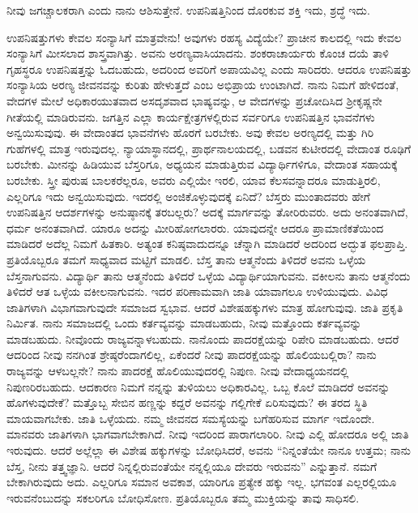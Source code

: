 ನೀವು ಜಗಚ್ಚಾಲಕರಾಗಿ ಎಂದು ನಾನು ಆಶಿಸುತ್ತೇನೆ. ಉಪನಿಷತ್ತಿನಿಂದ ದೊರಕುವ ಶಕ್ತಿ ಇದು, ಶ್ರದ್ಧೆ ಇದು.

ಉಪನಿಷತ್ತುಗಳು ಕೇವಲ ಸಂನ್ಯಾಸಿಗೆ ಮಾತ್ರವೇನು! ಅವುಗಳು ರಹಸ್ಯ ವಿದ್ಯೆಯೇ? ಪ್ರಾಚೀನ ಕಾಲದಲ್ಲಿ ಇದು ಕೇವಲ ಸಂನ್ಯಾಸಿಗೆ ಮೀಸಲಾದ ಶಾಸ್ತ್ರವಾಗಿತ್ತು. ಅವನು ಅರಣ್ಯವಾಸಿಯಾದನು. ಶಂಕರಾಚಾರ್ಯರು ಕೊಂಚ ದಯೆ ತಾಳಿ ಗೃಹಸ್ಥರೂ ಉಪನಿಷತ್ತನ್ನು ಓದಬಹುದು, ಅದರಿಂದ ಅವರಿಗೆ ಅಪಾಯವಿಲ್ಲ ಎಂದು ಸಾರಿದರು. ಆದರೂ ಉಪ\-ನಿಷತ್ತು ಸಂನ್ಯಾಸಿಯ ಅರಣ್ಯ ಜೀವನವನ್ನು ಕುರಿತು ಹೇಳುತ್ತದೆ ಎಂಬ ಅಭಿಪ್ರಾಯ ಉಂಟಾಗಿದೆ. ನಾನು ನಿಮಗೆ ಹೇಳಿದಂತೆ, ವೇದಗಳ ಮೇಲೆ ಅಧಿಕಾರಯುತವಾದ ಅಸದೃಶವಾದ ಭಾಷ್ಯವನ್ನು, ಆ ವೇದಗಳನ್ನು ಪ್ರಚೋದಿಸಿದ ಶ‍್ರೀಕೃಷ್ಣನೇ ಗೀತೆಯಲ್ಲಿ ಮಾಡಿರುವನು. ಜಗತ್ತಿನ ಎಲ್ಲಾ ಕಾರ್ಯಕ್ಷೇತ್ರಗಳಲ್ಲಿರುವ ಸರ್ವರಿಗೂ ಉಪನಿಷತ್ತಿನ ಭಾವನೆಗಳು ಅನ್ವಯಿಸುವುವು. ಈ ವೇದಾಂತದ ಭಾವನೆಗಳು ಹೊರಗೆ ಬರಬೇಕು. ಅವು ಕೇವಲ ಅರಣ್ಯದಲ್ಲಿ ಮತ್ತು ಗಿರಿ ಗುಹೆಗಳಲ್ಲಿ ಮಾತ್ರ ಇರುವುದಲ್ಲ. ನ್ಯಾಯಾಸ್ಥಾನದಲ್ಲಿ, ಪ್ರಾರ್ಥನಾಲಯದಲ್ಲಿ, ಬಡವನ ಕುಟೀರದಲ್ಲಿ ವೇದಾಂತ ರೂಢಿಗೆ ಬರಬೇಕು. ಮೀನನ್ನು ಹಿಡಿಯುವ ಬೆಸ್ತರಿಗೂ, ಅಧ್ಯಯನ ಮಾಡುತ್ತಿರುವ ವಿದ್ಯಾರ್ಥಿಗಳಿಗೂ, ವೇದಾಂತ ಸಹಾಯಕ್ಕೆ ಬರಬೇಕು. ಸ್ತ್ರೀ ಪುರುಷ ಬಾಲಕರೆಲ್ಲರೂ, ಅವರು ಎಲ್ಲಿಯೇ ಇರಲಿ, ಯಾವ ಕೆಲಸವನ್ನಾದರೂ ಮಾಡುತ್ತಿರಲಿ, ಎಲ್ಲರಿಗೂ ಇದು ಅನ್ವಯಿಸುವುದು. ಇದರಲ್ಲಿ ಅಂಜಿಕೊಳ್ಳುವುದಕ್ಕೆ ಏನಿದೆ? ಬೆಸ್ತರು ಮುಂತಾದವರು ಹೇಗೆ ಉಪನಿಷತ್ತಿನ ಆದರ್ಶಗಳನ್ನು ಅನುಷ್ಠಾನಕ್ಕೆ ತರಬಲ್ಲರು? ಅದಕ್ಕೆ ಮಾರ್ಗವನ್ನು ತೋರಿರುವರು. ಅದು ಅನಂತವಾಗಿದೆ, ಧರ್ಮ ಅನಂತವಾಗಿದೆ. ಯಾರೂ ಅದನ್ನು ಮೀರಿಹೋಗಲಾರರು. ಯಾವುದನ್ನೇ ಆದರೂ ಪ್ರಾಮಾಣಿಕತೆಯಿಂದ ಮಾಡಿದರೆ ಅದೆಲ್ಲ ನಿಮಗೆ ಹಿತಕಾರಿ. ಅತ್ಯಂತ ಕನಿಷ್ಠವಾದುದನ್ನೂ ಚೆನ್ನಾಗಿ ಮಾಡಿದರೆ ಅದರಿಂದ ಅದ್ಭುತ ಫಲಪ್ರಾಪ್ತಿ. ಪ್ರತಿಯೊಬ್ಬರೂ ತಮಗೆ ಸಾಧ್ಯವಾದ ಮಟ್ಟಿಗೆ ಮಾಡಲಿ. ಬೆಸ್ತ ತಾನು ಆತ್ಮನೆಂದು ತಿಳಿದರೆ ಅವನು ಒಳ್ಳೆಯ ಬೆಸ್ತನಾಗುವನು. ವಿದ್ಯಾರ್ಥಿ ತಾನು ಆತ್ಮನೆಂದು ತಿಳಿದರೆ ಒಳ್ಳೆಯ ವಿದ್ಯಾರ್ಥಿಯಾಗುವನು. ವಕೀಲನು ತಾನು ಆತ್ಮನೆಂದು ತಿಳಿದರೆ ಆತ ಒಳ್ಳೆಯ ವಕೀಲನಾಗುವನು. ಇದರ ಪರಿಣಾಮವಾಗಿ ಜಾತಿ ಯಾವಾಗಲೂ ಉಳಿಯುವುದು. ವಿವಿಧ ಜಾತಿಗಳಾಗಿ ವಿಭಾಗವಾಗುವುದೇ ಸಮಾಜದ ಸ್ವಭಾವ. ಆದರೆ ವಿಶೇಷಹಕ್ಕುಗಳು ಮಾತ್ರ ಹೋಗುವುವು. ಜಾತಿ ಪ್ರಕೃತಿ ನಿರ್ಮಿತ. ನಾನು ಸಮಾಜದಲ್ಲಿ ಒಂದು ಕರ್ತವ್ಯವನ್ನು ಮಾಡಬಹುದು, ನೀವು ಮತ್ತೊಂದು ಕರ್ತವ್ಯವನ್ನು ಮಾಡಬಹುದು. ನೀವೊಂದು ರಾಜ್ಯವನ್ನಾಳಬಹುದು. ನಾನೊಂದು ಪಾದರಕ್ಷೆಯನ್ನು ರಿಪೇರಿ ಮಾಡಬಹುದು. ಆದರೆ ಆದರಿಂದ ನೀವು ನನಗಿಂತ ಶ್ರೇಷ್ಠರೆಂದಾಗಲಿಲ್ಲ, ಏಕೆಂದರೆ ನೀವು ಪಾದರಕ್ಷೆಯನ್ನು ಹೊಲಿಯಬಲ್ಲಿರಾ? ನಾನು ರಾಜ್ಯವನ್ನು ಆಳಬಲ್ಲನೇ? ನಾನು ಪಾದರಕ್ಷೆ ಹೊಲಿಯುವುದರಲ್ಲಿ ನಿಪುಣ. ನೀವು ವೇದಾಧ್ಯಯನದಲ್ಲಿ ನಿಪುಣರಿರಬಹುದು. ಆದಕಾರಣ ನಿಮಗೆ ನನ್ನನ್ನು ತುಳಿಯಲು ಅಧಿಕಾರವಿಲ್ಲ. ಒಬ್ಬ ಕೊಲೆ ಮಾಡಿದರೆ ಅವನನ್ನು ಹೊಗಳುವುದೇಕೆ? ಮತ್ತೊಬ್ಬ ಸೇಬಿನ ಹಣ್ಣನ್ನು ಕದ್ದರೆ ಅವನನ್ನು ಗಲ್ಲಿಗೇಕೆ ಏರಿಸುವುದು? ಈ ತರದ ಸ್ಥಿತಿ ಮಾಯವಾಗಬೇಕು. ಜಾತಿ ಒಳ್ಳೆಯದು. ನಮ್ಮ ಜೀವನದ ಸಮಸ್ಯೆಯನ್ನು ಬಗೆಹರಿಸುವ ಮಾರ್ಗ ಇದೊಂದೇ. ಮಾನವರು ಜಾತಿಗಳಾಗಿ ಭಾಗವಾಗಬೇಕಾಗಿದೆ. ನೀವು ಇದರಿಂದ ಪಾರಾಗಲಾರಿರಿ. ನೀವು ಎಲ್ಲಿ ಹೋದರೂ ಅಲ್ಲಿ ಜಾತಿ ಇರುವುದು. ಆದರೆ ಅಲ್ಲೆಲ್ಲಾ ಈ ವಿಶೇಷ ಹಕ್ಕುಗಳನ್ನು ಬೋಧಿಸಿದರೆ, ಅವನು “ನಿನ್ನಂತೆಯೇ ನಾನೂ ಉತ್ತಮ; ನಾನು ಬೆಸ್ತ, ನೀನು ತತ್ತ್ವಜ್ಞಾನಿ. ಆದರೆ ನಿನ್ನಲ್ಲಿರುವಂತೆಯೇ ನನ್ನಲ್ಲಿಯೂ ದೇವರು ಇರುವನು” ಎನ್ನುತ್ತಾನೆ. ನಮಗೆ ಬೇಕಾಗಿರುವುದು ಅದು. ಎಲ್ಲರಿಗೂ ಸಮಾನ ಅವಕಾಶ, ಯಾರಿಗೂ ಪ್ರತ್ಯೇಕ ಹಕ್ಕು ಇಲ್ಲ. ಭಗವಂತ ಎಲ್ಲರಲ್ಲಿಯೂ ಇರುವನೆಂಬುದನ್ನು ಸಕಲರಿಗೂ ಬೋಧಿಸೋಣ. ಪ್ರತಿಯೊಬ್ಬರೂ ತಮ್ಮ ಮುಕ್ತಿಯನ್ನು ತಾವು ಸಾಧಿಸಲಿ.

